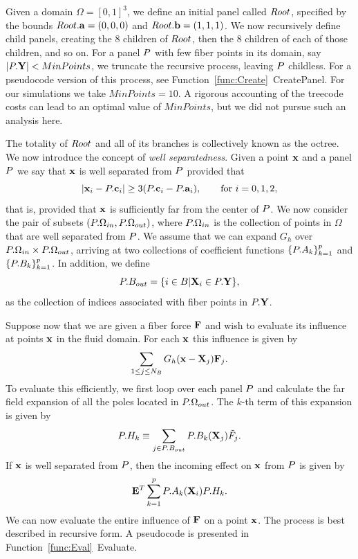 Given a domain $\Omega = [0,1]^3$, we define an initial panel called $Root$, specified by the bounds $Root.\mathbf{a} = (0,0,0)$ and $Root.\mathbf{b} = (1,1,1)$. We now recursively define child panels, creating the $8$ children of $Root$, then the $8$ children of each of those children, and so on. For a panel $P$ with few fiber points in its domain, say $|P.\mathbf{Y}| < MinPoints$, we truncate the recursive process, leaving $P$ childless. For a pseudocode version of this process, see Function~\ref{func:Create}~CreatePanel. For our simulations we take $MinPoints = 10$. A rigorous accounting of the treecode costs can lead to an optimal value of $MinPoints$, but we did not pursue such an analysis here.

The totality of $Root$ and all of its branches is collectively known as the octree. 
We now introduce the concept of \textit{well separatedness}. Given a point $\mathbf{x}$ and a panel $P$ we say that $\mathbf{x}$ is well separated from $P$ provided that 
\begin{equation}
|\mathbf{x}_i - P.\mathbf{c}_i| \geq 3(P.\mathbf{c}_i - P.\mathbf{a}_i), \qquad\text{for $i=0,1,2$}, \label{ws}
\end{equation}
that is, provided that $\mathbf{x}$ is sufficiently far from the center of $P$. We now consider the pair of subsets $(P.\Omega_{in}, P.\Omega_{out})$, where $P.\Omega_{in}$ is the collection of points in $\Omega$ that are well separated from $P$. We assume that we can expand $G_h$ over $P.\Omega_{in}\times P.\Omega_{out}$, arriving at two collections of coefficient functions $\{P.A_k\}_{k=1}^p$ and $\{P.B_k\}_{k=1}^p$. In addition,  we define
\begin{equation}
P.B_{out} = \{i\in B | \mathbf{X}_i\in P.\mathbf{Y}\},
\end{equation}
as the collection of indices associated with fiber points in $P.\mathbf{Y}$. 

Suppose now that we are given a fiber force $\mathbf{F}$ and wish to evaluate its influence at points $\mathbf{x}$ in the fluid domain. For each $\mathbf{x}$ this influence is given by
\begin{equation}
\sum_{1\leq j\leq N_B} G_h(\mathbf{x} - \mathbf{X}_j) \mathbf{F}_j.
\end{equation}
To evaluate this efficiently, we first loop over each panel $P$ and calculate the far field expansion of all the poles located in $P.\Omega_{out}$. The $k$-th term of this expansion is given by
\begin{equation}
P.H_k \equiv \sum_{j\in P.B_{out}}
P.B_k(\mathbf{X}_j) \tilde{F}_j.
\label{meq:OutgoingA}
\end{equation}
If $\mathbf{x}$ is well separated from $P$, then the incoming effect on $\mathbf{x}$ from $P$ is given by
\begin{equation}
\mathbf{E}^T \displaystyle\sum_{k=1}^{p}P.A_k(\mathbf{X}_i)P.H_k.
\label{meq:IncomingA}
\end{equation}
We can now evaluate the entire influence of $\mathbf{F}$ on a point $\mathbf{x}$. The process is best described in recursive form. A pseudocode is presented in Function~\ref{func:Eval}~Evaluate. 

